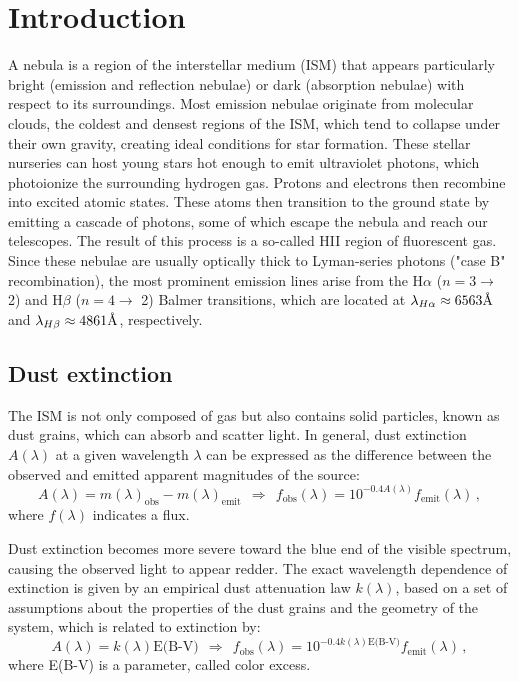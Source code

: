 \documentclass[fleqn,usenatbib]{mnras}
\begin{document}
\section{Introduction}\label{sec:introduction}
A nebula is a region of the interstellar medium (ISM) that appears particularly bright (emission and reflection nebulae) or dark (absorption nebulae) with respect to its surroundings. 
Most emission nebulae originate from molecular clouds, the coldest and densest regions of the ISM, which tend to collapse under their own gravity, creating ideal conditions for star formation.
These stellar nurseries can host young stars hot enough to emit ultraviolet photons, which photoionize the surrounding hydrogen gas. 
Protons and electrons then recombine into excited atomic states. 
These atoms then transition to the ground state by emitting a cascade of photons, some of which escape the nebula and reach our telescopes.
The result of this process is a so-called HII region of fluorescent gas.
Since these nebulae are usually optically thick to Lyman-series photons ("case B" recombination), the most prominent emission lines arise from the H$\alpha$ ($n=3 \rightarrow$ 2) and H$\beta$ ($n=4 \rightarrow$ 2) Balmer transitions, which are located at $\lambda_{H\alpha} \approx 6563 \text{\r{A}}$ and $\lambda_{H\beta} \approx 4861 \text{\r{A}}$, respectively.

\subsection{Dust extinction}\label{sec:dust_introduction}
The ISM is not only composed of gas but also contains solid particles, known as dust grains, which can absorb and scatter light.
In general, dust extinction $A(\lambda)$ at a given wavelength $\lambda$ can be expressed as the difference between the observed and emitted apparent magnitudes of the source:
\begin{equation}
  A(\lambda) = m(\lambda)_\text{obs} - m(\lambda)_\text{emit} \:\: \Rightarrow \:\: 
  f_\text{obs} (\lambda) = 10^{-0.4 A(\lambda)} f_\text{emit} (\lambda) \, ,
  \label{eq:dust_extinction}
\end{equation}
where $f(\lambda)$ indicates a flux.

Dust extinction becomes more severe toward the blue end of the visible spectrum, causing the observed light to appear redder. 
The exact wavelength dependence of extinction is given by an empirical dust attenuation law $k(\lambda)$, based on a set of assumptions about the properties of the dust grains and the geometry of the system, which is related to extinction by: 
\begin{equation}
  A(\lambda) = k(\lambda) \text{E(B-V)} \:\: \Rightarrow \:\: 
  f_\text{obs} (\lambda) = 10^{-0.4 k(\lambda) \text{E(B-V)}} f_\text{emit} (\lambda) \, ,
  \label{eq:dust_attenuation_law}
\end{equation}
where E(B-V) is a parameter, called color excess.
\end{document}
